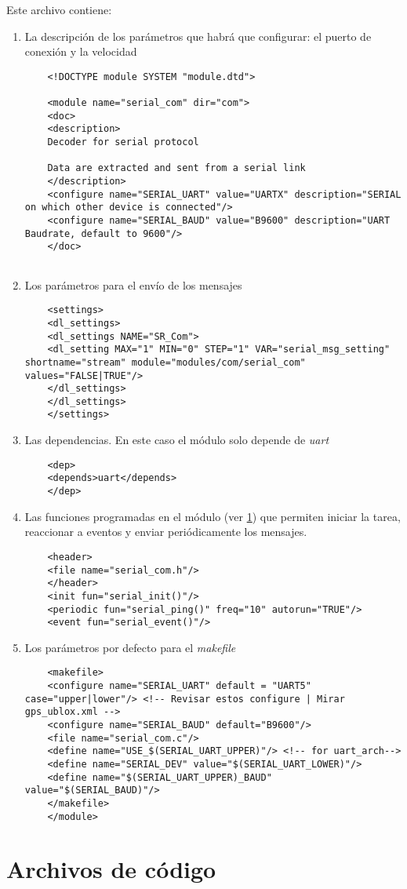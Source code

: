 Este archivo contiene:
\begin{enumerate}
	\item La descripción de los parámetros que habrá que configurar: el puerto de conexión y la velocidad
	\begin{verbatim}
	<!DOCTYPE module SYSTEM "module.dtd">
	
	<module name="serial_com" dir="com">
	<doc>
	<description>
	Decoder for serial protocol
	
	Data are extracted and sent from a serial link 
	</description>
	<configure name="SERIAL_UART" value="UARTX" description="SERIAL on which other device is connected"/>
	<configure name="SERIAL_BAUD" value="B9600" description="UART Baudrate, default to 9600"/>
	</doc>
	
	\end{verbatim}
	
	\item Los parámetros para el envío de los mensajes
	\begin{verbatim}
	<settings>
	<dl_settings>
	<dl_settings NAME="SR_Com">
	<dl_setting MAX="1" MIN="0" STEP="1" VAR="serial_msg_setting" shortname="stream" module="modules/com/serial_com" values="FALSE|TRUE"/>
	</dl_settings>
	</dl_settings>
	</settings>
	\end{verbatim}
	
	\item Las dependencias. En este caso el módulo solo depende de \textit{uart}
	\begin{verbatim}
	<dep>
	<depends>uart</depends>
	</dep>
	\end{verbatim}
	
	\item Las funciones programadas en el módulo (ver \ref{sec:2}) que permiten iniciar la tarea, reaccionar a eventos y enviar periódicamente los mensajes.
	\begin{verbatim}
	<header>
	<file name="serial_com.h"/>
	</header>
	<init fun="serial_init()"/>
	<periodic fun="serial_ping()" freq="10" autorun="TRUE"/>
	<event fun="serial_event()"/>
	\end{verbatim}
	
	\item Los parámetros por defecto para el \textit{makefile}
	
	\begin{verbatim}
	<makefile>
	<configure name="SERIAL_UART" default = "UART5" case="upper|lower"/> <!-- Revisar estos configure | Mirar gps_ublox.xml -->
	<configure name="SERIAL_BAUD" default="B9600"/>
	<file name="serial_com.c"/>
	<define name="USE_$(SERIAL_UART_UPPER)"/> <!-- for uart_arch-->
	<define name="SERIAL_DEV" value="$(SERIAL_UART_LOWER)"/>
	<define name="$(SERIAL_UART_UPPER)_BAUD" value="$(SERIAL_BAUD)"/>
	</makefile>
	</module>
	\end{verbatim}

\end{enumerate}


\section{Archivos de código} \label{sec:2}


